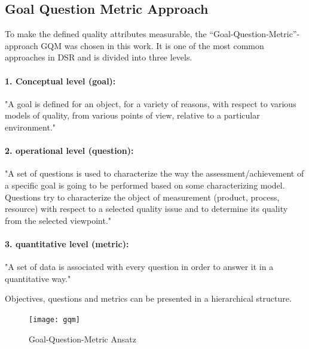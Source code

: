 \subsection{Goal Question Metric Approach}
To make the defined quality attributes measurable, the “Goal-Question-Metric”-approach \ac{GQM} was chosen in this work. It is one of the most common approaches in DSR and is divided into three levels.
\cite[p. 3]{basili_goalquestionmetric_}

\paragraph{1. Conceptual level (goal):}
"A goal is defined for an object, for a variety of reasons,
with respect to various models of quality, from various points of view, relative to a
particular environment." \cite[p. 3]{basili_goalquestionmetric_}

\paragraph{2. operational level (question):}
"A set of questions is used to characterize the way
the assessment/achievement of a specific goal is going to be performed based on
some characterizing model. Questions try to characterize the object of
measurement (product, process, resource) with respect to a selected quality issue
and to determine its quality from the selected viewpoint." \cite[p. 3]{basili_goalquestionmetric_}

\paragraph{3. quantitative level (metric):}
"A set of data is associated with every question in order to answer it in a quantitative way."  \cite[p. 3]{basili_goalquestionmetric_}

Objectives, questions and metrics can be presented in a hierarchical structure.

\begin{figure}[H] %
	\centering
	\texttt{[image: gqm]}
	\caption[GQM tree stucture ]{Goal-Question-Metric Ansatz \cite[p. 3]{basili_goalquestionmetric_}} 
	\label{fig:gqm}
\end{figure}





